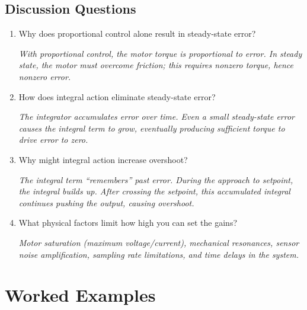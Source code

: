 \subsection{Discussion Questions}

\begin{enumerate}
    \item Why does proportional control alone result in steady-state error?

    \textit{With proportional control, the motor torque is proportional to error. In steady state, the motor must overcome friction; this requires nonzero torque, hence nonzero error.}

    \item How does integral action eliminate steady-state error?

    \textit{The integrator accumulates error over time. Even a small steady-state error causes the integral term to grow, eventually producing sufficient torque to drive error to zero.}

    \item Why might integral action increase overshoot?

    \textit{The integral term ``remembers'' past error. During the approach to setpoint, the integral builds up. After crossing the setpoint, this accumulated integral continues pushing the output, causing overshoot.}

    \item What physical factors limit how high you can set the gains?

    \textit{Motor saturation (maximum voltage/current), mechanical resonances, sensor noise amplification, sampling rate limitations, and time delays in the system.}
\end{enumerate}

\section{Worked Examples}

